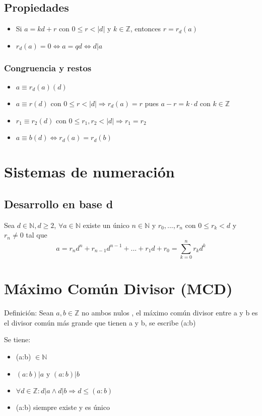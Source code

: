 \documentclass{report}
\begin{document}
\subsection{Propiedades}
\begin{itemize}
    \item Si $a = kd + r$ con $0 \leq r < |d|$ y $k \in \mathbb{Z}$, entonces $r = r_d (a)$
    \item $r_d(a) = 0 \iff a = qd \iff d | a$
\end{itemize}
\subsubsection{Congruencia y restos}
\begin{itemize}
    \item $a \equiv r_d(a) (d)$
    \item $a \equiv r (d)$ con $0 \leq r < |d| \Rightarrow r_d(a) = r$ pues $a-r=k \cdot d$ con $k \in \mathbb{Z}$
    \item $r_1 \equiv r_2 (d)$ con $0 \leq r_1,r_2 < |d| \Rightarrow r_1 = r_2$
    \item $a \equiv b (d) \iff r_d (a) = r_d (b)$
\end{itemize}

\section{Sistemas de numeración}
\subsection{Desarrollo en base d}
Sea $d \in \mathbb{N}, d \geq 2$, $\forall a \in \mathbb{N}$ existe un único $n \in \mathbb{N}$ y $r_0,...,r_n$ con $0 \leq r_k < d$ y $r_n \neq 0$ tal que \begin{equation}
    a = r_nd^n + r_{n-1}d^{n-1}+...+r_1d + r_0 = \sum_{k=0}^n r_kd^k
\end{equation}

\section{Máximo Común Divisor (MCD)}
Definición: Sean $a,b \in \mathbb{Z}$ no ambos nulos , el máximo común divisor entre a y b es el divisor común más grande que tienen a y b, se escribe (a:b)

Se tiene: \begin{itemize}
    \item (a:b) $\in \mathbb{N}$
    \item $(a:b)|a  \text{ y } (a:b)|b$
    \item $\forall d \in \mathbb{Z}: d|a \land d|b \Rightarrow d \leq (a:b)$
    \item (a:b) siempre existe y es único
\end{itemize}
\end{document}
